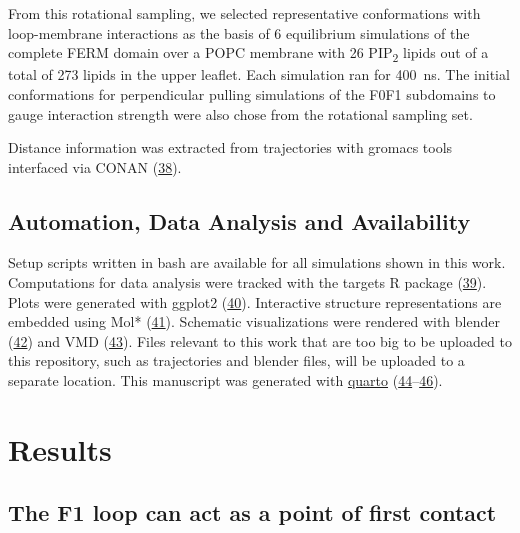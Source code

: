 \documentclass[
  twocolumn]{biophys-new-mod}
\begin{document}
From this rotational sampling, we selected representative conformations
with loop-membrane interactions as the basis of 6 equilibrium
simulations of the complete FERM domain over a POPC membrane with 26
PIP\textsubscript{2} lipids out of a total of 273 lipids in the upper
leaflet. Each simulation ran for 400~ns. The initial conformations for
perpendicular pulling simulations of the F0F1 subdomains to gauge
interaction strength were also chose from the rotational sampling set.

Distance information was extracted from trajectories with gromacs tools
interfaced via CONAN
(\protect\hyperlink{ref-mercadanteCONANToolDecode2018}{38}).

\hypertarget{automation-data-analysis-and-availability}{%
\subsection{Automation, Data Analysis and
Availability}\label{automation-data-analysis-and-availability}}

Setup scripts written in bash are available for all simulations shown in
this work. Computations for data analysis were tracked with the targets
R package (\protect\hyperlink{ref-landauTargetsPackageDynamic2021}{39}).
Plots were generated with ggplot2 (\protect\hyperlink{ref-ggplot}{40}).
Interactive structure representations are embedded using Mol*
(\protect\hyperlink{ref-molstar}{41}). Schematic visualizations were
rendered with blender (\protect\hyperlink{ref-blender}{42}) and VMD
(\protect\hyperlink{ref-vmd}{43}). Files relevant to this work that are
too big to be uploaded to this repository, such as trajectories and
blender files, will be uploaded to a separate location. This manuscript
was generated with \href{https://quarto.org/}{quarto}
(\protect\hyperlink{ref-quarto}{44}--\protect\hyperlink{ref-rbetterposter}{46}).

\hypertarget{results}{%
\section{Results}\label{results}}

\hypertarget{the-f1-loop-can-act-as-a-point-of-first-contact}{%
\subsection{The F1 loop can act as a point of first
contact}\label{the-f1-loop-can-act-as-a-point-of-first-contact}}
\end{document}
